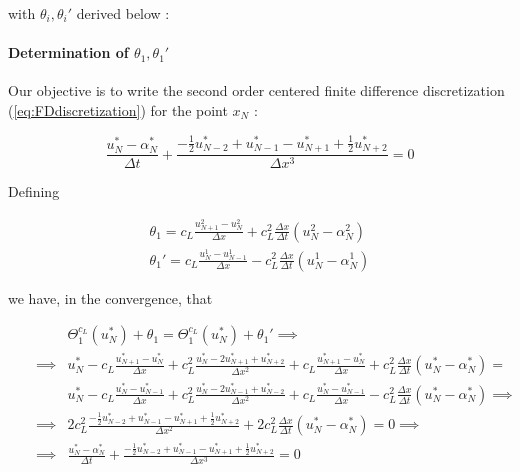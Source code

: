 \noindent with $\theta_i, \theta_i'$ derived below : 


\paragraph{Determination of $\theta_1, \theta_1'$}

\indent Our objective is to write the second order centered finite difference discretization (\ref{eq:FDdiscretization}) for the point $x_{N}$ :

\begin{equation*}
    \label{eq:FDdiscretizationN}
    \frac{u_{N}^* - \alpha_{N}^*}{\Delta t} + \frac{-\frac{1}{2}u_{N-2}^* + u_{N-1}^* - u_{N+1}^* + \frac{1}{2}u_{N+2}^* }{\Delta x ^3} = 0
\end{equation*}

\indent Defining 

\begin{gather*}
    \theta_1 = c_L \frac{u_{N+1}^2 - u_{N}^2}{\Delta x} + c_L^2\frac{\Delta x}{\Delta t} \left( u_{N}^2 - \alpha_{N}^2 \right)\\
    \theta_1' = c_L \frac{u_{N}^1 - u_{N-1}^1}{\Delta x} - c_L^2\frac{\Delta x}{\Delta t} \left( u_{N}^1 - \alpha_{N}^1 \right)
\end{gather*}

\indent we have, in the convergence, that

\begin{equation*}
\label{eq:modifiedTBC1}
\begin{aligned}
&& &    \Theta_1^{c_L}(u_N^*) + \theta_1 = \Theta_1^{c_L}(u_N^*) + \theta_1'\implies \\
&& \implies &    u_N^* - c_L \frac{u_{N+1}^* - u_N^*}{\Delta x} + c_L^2\frac{u_N^* - 2u_{N+1}^* + u_{N+2}^*}{\Delta x^2} + c_L \frac{u_{N+1}^* - u_{N}^*}{\Delta x} + c_L^2\frac{\Delta x}{\Delta t} \left( u_{N}^* - \alpha_{N}^* \right) = \\
&& & u_N^* - c_L \frac{u_{N}^* - u_{N-1}^*}{\Delta x} + c_L^2\frac{u_N^* - 2u_{N-1}^* + u_{N-2}^*}{\Delta x^2} + c_L \frac{u_{N}^* - u_{N-1}^*}{\Delta x} - c_L^2\frac{\Delta x}{\Delta t} \left( u_{N}^* - \alpha_{N}^* \right) \implies \\
 && \implies &    2c_L^2 \frac{-\frac{1}{2}u_{N-2}^* + u_{N-1}^* - u_{N+1}^* + \frac{1}{2}u_{N+2}^* }{\Delta x ^2}  +             2c_L^2\frac{\Delta x}{\Delta t} \left( u_{N}^* - \alpha_{N}^* \right) = 0 \implies \\
&& \implies &    \frac{u_{N}^* - \alpha_{N}^*}{\Delta t} + \frac{-\frac{1}{2}u_{N-2}^* + u_{N-1}^* - u_{N+1}^* + \frac{1}{2}u_{N+2}^* }{\Delta x ^3} = 0
\end{aligned}
\end{equation*}

